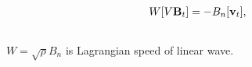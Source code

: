 \documentclass{beamer}
\begin{document}
\begin{frame}[fragile]
\begin{columns}
\begin{column}{0.5\textwidth}
{\begin{align*}
W[V\mbf{B}_{t}] &= -B_n[\mbf{v}_{t}], %
\end{align*}
}
\ebi

\end{column}
\end{columns}

\pause
\bei
\item $W = \sqrt{\rho}B_n$ is Lagrangian speed of linear wave.
\ebi
\end{frame}
\end{document}
